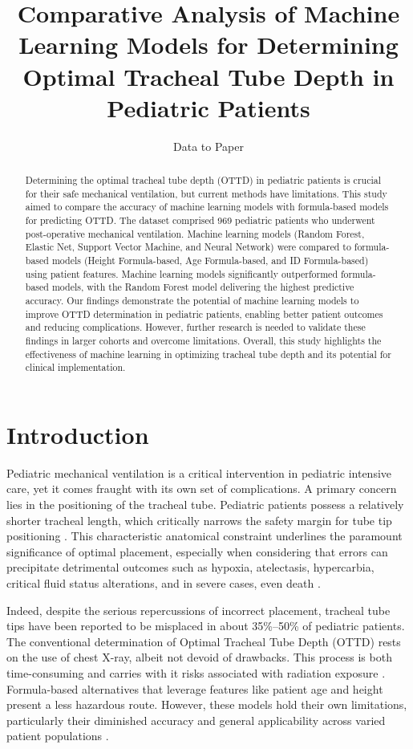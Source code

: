 \documentclass[11pt]{article}
\title{Comparative Analysis of Machine Learning Models for Determining Optimal Tracheal Tube Depth in Pediatric Patients}
\author{Data to Paper}
\begin{document}
\maketitle
\begin{abstract}
Determining the optimal tracheal tube depth (OTTD) in pediatric patients is crucial for their safe mechanical ventilation, but current methods have limitations. This study aimed to compare the accuracy of machine learning models with formula-based models for predicting OTTD. The dataset comprised 969 pediatric patients who underwent post-operative mechanical ventilation. Machine learning models (Random Forest, Elastic Net, Support Vector Machine, and Neural Network) were compared to formula-based models (Height Formula-based, Age Formula-based, and ID Formula-based) using patient features. Machine learning models significantly outperformed formula-based models, with the Random Forest model delivering the highest predictive accuracy. Our findings demonstrate the potential of machine learning models to improve OTTD determination in pediatric patients, enabling better patient outcomes and reducing complications. However, further research is needed to validate these findings in larger cohorts and overcome limitations. Overall, this study highlights the effectiveness of machine learning in optimizing tracheal tube depth and its potential for clinical implementation.
\end{abstract}
\section*{Introduction}

Pediatric mechanical ventilation is a critical intervention in pediatric intensive care, yet it comes fraught with its own set of complications. A primary concern lies in the positioning of the tracheal tube. Pediatric patients possess a relatively shorter tracheal length, which critically narrows the safety margin for tube tip positioning \cite{Rudin2018StopEB}. This characteristic anatomical constraint underlines the paramount significance of optimal placement, especially when considering that errors can precipitate detrimental outcomes such as hypoxia, atelectasis, hypercarbia, critical fluid status alterations, and in severe cases, even death \cite{Ingelse2017EarlyFO, Li2021ACS}.

Indeed, despite the serious repercussions of incorrect placement, tracheal tube tips have been reported to be misplaced in about 35\%–50\% of pediatric patients. The conventional determination of Optimal Tracheal Tube Depth (OTTD) rests on the use of chest X-ray, albeit not devoid of drawbacks. This process is both time-consuming and carries with it risks associated with radiation exposure \cite{Bendavid2022ANM}. Formula-based alternatives that leverage features like patient age and height present a less hazardous route. However, these models hold their own limitations, particularly their diminished accuracy and general applicability across varied patient populations \cite{Park2021DevelopmentOM, Luo2022DevelopmentAV}.
\end{document}
